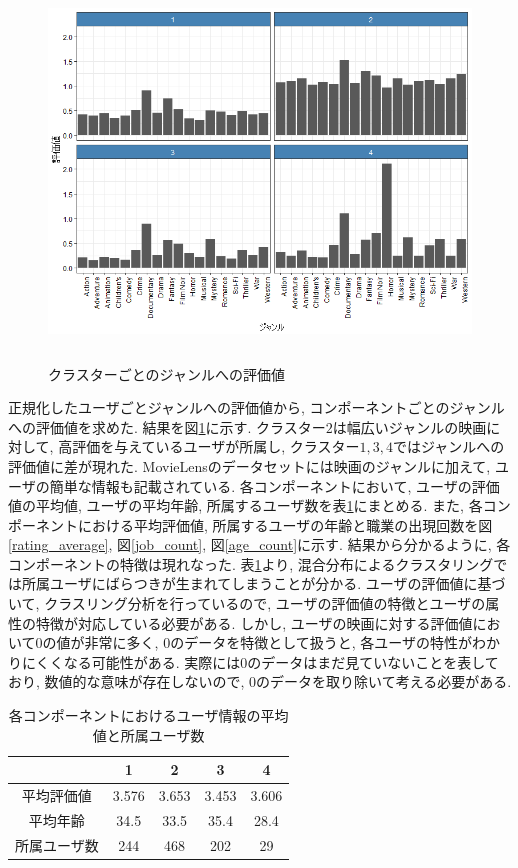 \documentclass[a4j,12pt]{jarticle}
\begin{document}
\begin{figure}[H]
\begin{center}
\includegraphics[clip,height= 100mm]{data/cluster_plot.png}
\end{center}
\caption{クラスターごとのジャンルへの評価値}
\label{clustergenre}
\end{figure}

正規化したユーザごとジャンルへの評価値から, コンポーネントごとのジャンルへの評価値を求めた. 結果を図\ref{clustergenre}に示す. クラスター$2$は幅広いジャンルの映画に対して, 高評価を与えているユーザが所属し, クラスター$1,3,4$ではジャンルへの評価値に差が現れた. 
MovieLensのデータセットには映画のジャンルに加えて, ユーザの簡単な情報も記載されている. 各コンポーネントにおいて, ユーザの評価値の平均値, ユーザの平均年齢, 所属するユーザ数を表\ref{component_stat}にまとめる. また, 各コンポーネントにおける平均評価値, 所属するユーザの年齢と職業の出現回数を図\ref{rating_average}, 図\ref{job_count}, 図\ref{age_count}に示す. 結果から分かるように, 各コンポーネントの特徴は現れなった. 表\ref{component_stat}より, 混合分布によるクラスタリングでは所属ユーザにばらつきが生まれてしまうことが分かる. ユーザの評価値に基づいて, クラスリング分析を行っているので, ユーザの評価値の特徴とユーザの属性の特徴が対応している必要がある. しかし, ユーザの映画に対する評価値において$0$の値が非常に多く, $0$のデータを特徴として扱うと, 各ユーザの特性がわかりにくくなる可能性がある. 実際には$0$のデータはまだ見ていないことを表しており, 数値的な意味が存在しないので, $0$のデータを取り除いて考える必要がある.

\begin{table}[H]
\begin{center}
\caption{各コンポーネントにおけるユーザ情報の平均値と所属ユーザ数}   %
\label{component_stat}   %
\begin{tabular}{c | c c c c}
\hline
&1 & 2 & 3 & 4 \\ \hline \hline
平均評価値 &3.576 & 3.653 & 3.453 & 3.606 \\ \hline
平均年齢 & 34.5 &  33.5 & 35.4 & 28.4 \\ \hline
所属ユーザ数 & 244 & 468 & 202 & 29 \\ \hline
\end{tabular}
\end{center}
\end{table}
\end{document}
